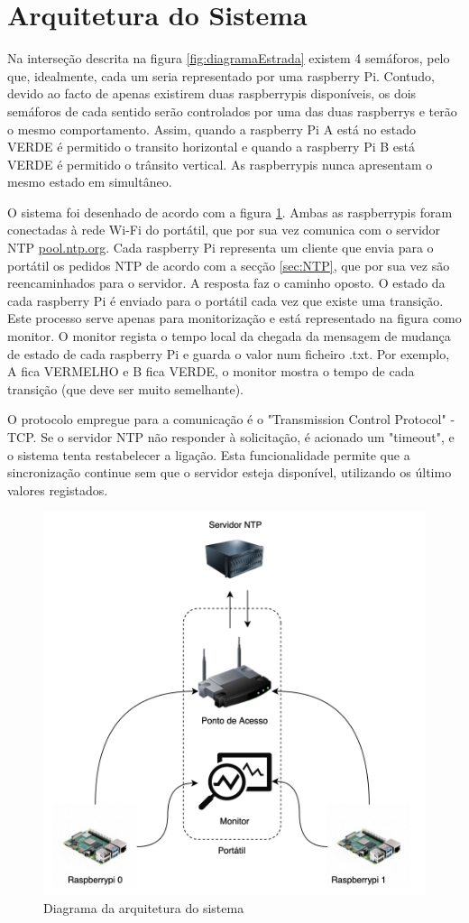 \section{Arquitetura do Sistema}

    Na interseção descrita na figura \ref{fig:diagramaEstrada} existem 4 semáforos, pelo que, idealmente, cada um seria representado por uma raspberry Pi. Contudo, devido ao facto de apenas existirem duas raspberrypis disponíveis, os dois semáforos de cada sentido serão controlados por  uma das duas raspberrys e terão o mesmo comportamento. Assim, quando a raspberry Pi A está no estado VERDE é permitido o transito horizontal e quando a raspberry Pi B está VERDE é permitido o trânsito vertical. As raspberrypis nunca apresentam o mesmo estado em simultâneo. 

    O sistema foi desenhado de acordo com a figura \ref{fig:diagramaSistema}. Ambas as raspberrypis foram conectadas à rede Wi-Fi do portátil, que por sua vez comunica com o servidor NTP \url{pool.ntp.org}. Cada raspberry Pi representa um cliente que envia para o portátil os pedidos NTP de acordo com a secção \ref{sec:NTP}, que por sua vez são reencaminhados para o servidor. A resposta faz o caminho oposto. O estado da cada raspberry Pi é enviado para o portátil cada vez que existe uma transição. Este processo serve apenas para monitorização e está representado na figura como monitor. O monitor regista o tempo local da chegada da mensagem de mudança de estado de cada raspberry Pi e guarda o valor num ficheiro .txt. Por exemplo, A fica VERMELHO e B fica VERDE, o monitor mostra o tempo de cada transição (que deve ser muito semelhante).

    O protocolo empregue para a comunicação é o "Transmission Control Protocol" - TCP. Se o servidor NTP não responder à solicitação, é acionado um "timeout", e o sistema tenta restabelecer a ligação. Esta funcionalidade permite que a sincronização continue sem que o servidor esteja disponível, utilizando os último valores registados.

    \begin{figure}[h]
        \centering
        \includegraphics[width=0.8\linewidth]{figures/diagramaSistema.png}
        \caption{Diagrama da arquitetura do sistema \cite{b1}}
        \label{fig:diagramaSistema}
    \end{figure}